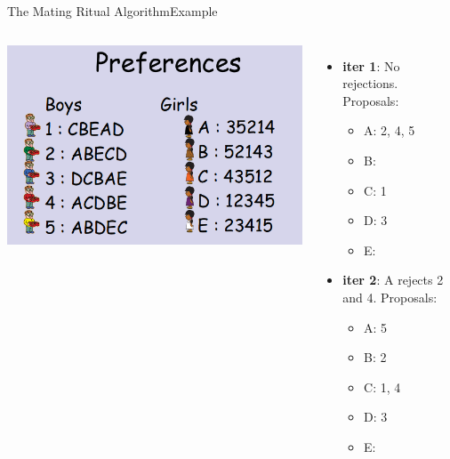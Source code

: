 \begin{frame}{The Mating Ritual Algorithm}{Example}

  \begin{columns}
    \includegraphics[width=1\textwidth]{../img/marriage2}
    {\large
      \begin{itemize}
      \item {\bf iter 1}: No rejections. Proposals:
        \begin{itemize}
        \item A: 2, 4, 5
        \item B:
        \item C: 1
        \item D: 3
        \item E:
        \end{itemize}

      \item {\bf iter 2}: A rejects 2 and 4. Proposals:
        \begin{itemize}
        \item A: 5
        \item B: 2
        \item C: 1, 4
        \item D: 3
        \item E:
        \end{itemize}
      \end{itemize}

    }
  \end{columns}
\end{frame}

